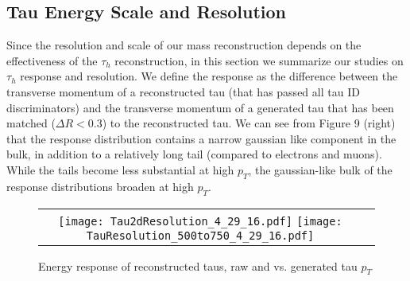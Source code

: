 \subsection{Tau Energy Scale and Resolution}

Since the resolution and scale of our mass reconstruction depends on the effectiveness of the $\tau_{h}$ reconstruction, in this section we summarize our studies on $\tau_{h}$ response and resolution. We define the response as the difference between the transverse momentum of a reconstructed tau (that has passed all tau ID discriminators) and the transverse momentum of a generated tau that has been matched ($\Delta R < 0.3$) to the reconstructed tau. We can see from Figure 9 (right) that the response distribution contains a narrow gaussian like component in the bulk, in addition to a relatively long tail (compared to electrons and muons). While the tails become less substantial at high $p_{T}$, the gaussian-like bulk of the response distributions broaden at high $p_{T}$.
 
\begin{figure}[tbh!]
  \centering
  \begin{tabular}{cc}
  \texttt{[image: Tau2dResolution\_4\_29\_16.pdf]}
  \texttt{[image: TauResolution\_500to750\_4\_29\_16.pdf]}
  \end{tabular}
  \caption{Energy response of reconstructed taus, raw and vs. generated tau $p_{T}$}
  \label{fig:Tau2dResolution}
\end{figure}


\fi